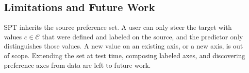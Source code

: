 \subsection{Limitations and Future Work}
\label{sec:limitations}

SPT inherits the source preference set. A user can only steer the target with
values $c\in\mathcal{C}$ that were defined and labeled on the source, and the
predictor only distinguishes those values. A new value on an existing axis, or a
new axis, is out of scope. Extending the set at test time, composing labeled
axes, and discovering preference axes from data are left to future work.
